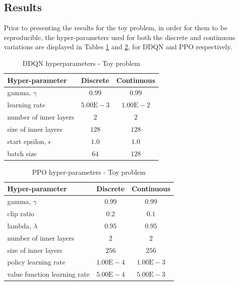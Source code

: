 \newpage

\subsection{Results} \label{resultsToySec}


Prior to presenting the results for the toy problem, in order for them to be reproducible, the hyper-parameters used for both the discrete and continuous variations are displayed in Tables \ref{ddqnHyperToy} and \ref{ppoHyperToy}, for \gls{DDQN} and \gls{PPO} respectively.

\begin{table}[H]
    \centering
    \caption{\gls{DDQN} hyperparameters - Toy problem}
    \label{ddqnHyperToy}
    \begin{tabular}{lcc}
        \toprule
        \textbf{Hyper-parameter} & \multicolumn{1}{l}{\textbf{Discrete}} & \multicolumn{1}{l}{\textbf{Continuous}} \\ \midrule
        gamma, $\gamma$ & $0.99$ & $0.99$ \\
        learning rate & $5.00\mathrm{E}-3$ & $1.00\mathrm{E}-2$ \\
        number of inner layers & $2$ & $2$ \\
        size of inner layers & $128$ & $128$ \\
        start epsilon, $\epsilon$  & $1.0$ & $1.0$ \\
        batch size & $64$ & $128$ \\ \bottomrule
    \end{tabular}
\end{table}

\begin{table}[H]
    \centering
    \caption{\gls{PPO} hyper-parameters - Toy problem}
    \label{ppoHyperToy}
    \begin{tabular}{lcc}
        \toprule
        \textbf{Hyper-parameter} & \multicolumn{1}{l}{\textbf{Discrete}} & \multicolumn{1}{l}{\textbf{Continuous}} \\ \midrule
        gamma, $\gamma$ & $0.99$ & $0.99$ \\
        clip ratio & $0.2$ & $0.1$ \\
        lambda, $\lambda$ & $0.95$ & $0.95$ \\
        number of inner layers & $2$ & $2$ \\
        size of inner layers & $256$ & $256$ \\
        policy learning rate & $1.00\mathrm{E}-4$ & $1.00\mathrm{E}-3$ \\
        value function learning rate & $5.00\mathrm{E}-4$ & $5.00\mathrm{E}-3$ \\ \bottomrule
    \end{tabular}
\end{table}


